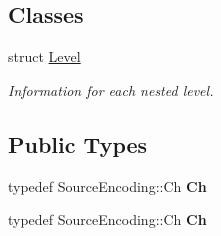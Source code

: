 \subsection*{Classes}
\begin{DoxyCompactItemize}
\item 
struct \hyperlink{structWriter_1_1Level}{Level}
\begin{DoxyCompactList}\small\item\em Information for each nested level. \end{DoxyCompactList}\end{DoxyCompactItemize}
\subsection*{Public Types}
\begin{DoxyCompactItemize}
\item 
\mbox{\label{classWriter_a5ba0d623162839460024b517fc2d5868}} 
typedef Source\+Encoding\+::\+Ch {\bfseries Ch}
\item 
\mbox{\label{classWriter_a5ba0d623162839460024b517fc2d5868}} 
typedef Source\+Encoding\+::\+Ch {\bfseries Ch}
\end{DoxyCompactItemize}
